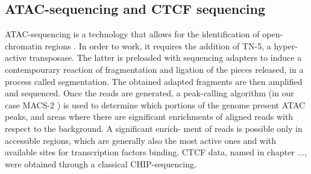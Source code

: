 \subsection{ATAC-sequencing and CTCF sequencing}
ATAC-sequencing is a technology that allows for the identification of open-
chromatin regions \cite{buenrostroTranspositionNativeChromatin2013a, grandiChromatinAccessibilityProfiling2022}. In order to work, it requires the addition of TN-5,
a hyper-active transposase. The latter is preloaded with sequencing adapters
\cite{grandiChromatinAccessibilityProfiling2022}
to induce a contempourary reaction of fragmentation and ligation of the pieces released, in
a process called segmentation. The obtained adapted fragments are then amplified and sequenced. Once the reads are generated, a peak-calling algorithm (in our case MACS-2 
\cite{zhangModelbasedAnalysisChIPSeq2008a}
) is used to determine which portions of the genome present ATAC peaks, and areas where there are
significant enrichments of aligned reads with respect to the background. A significant enrich-
ment of reads is possible only in accessible regions, which are generally also the most active
ones and with available sites for transcription factors binding.
CTCF data, named in chapter ..., were obtained through a classical CHIP-sequencing.
